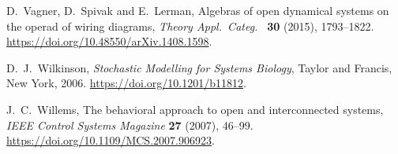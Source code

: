 \documentclass[ a4paper, onecolumn, superscriptaddress,10pt, accepted=2022-02-14, issue=3, volume=4, shorttitle=papers/compositionality-4-3 ]{compositionalityarticle}
\begin{document}
\begin{thebibliography}{100}
 D.\ Vagner, D.\ Spivak and E.\ Lerman, Algebras of open dynamical systems on the operad of wiring diagrams, \textsl{Theory Appl.\ Categ.\ } \textbf{30} (2015), 1793--1822. \href{https://doi.org/10.48550/arXiv.1408.1598}{https://doi.org/10.48550/arXiv.1408.1598}.

 D.\ J.\ Wilkinson, \textsl{Stochastic Modelling for Systems Biology},
Taylor and Francis, New York, 2006. \href{https://doi.org/10.1201/b11812}{https://doi.org/10.1201/b11812}.

 J.\ C.\ Willems, The behavioral approach to open and interconnected systems, \textsl{IEEE Control Systems Magazine} \textbf{27}
(2007), 46--99. \href{https://doi.org/10.1109/MCS.2007.906923}{https://doi.org/10.1109/MCS.2007.906923}.

\end{thebibliography}
\end{document}
